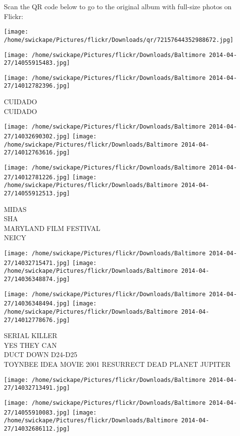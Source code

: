 \documentclass[10pt,letterpaper]{article}
\begin{document}
Scan the QR code below to go to the original album with full-size photos on Flickr:

\texttt{[image: /home/swickape/Pictures/flickr/Downloads/qr/72157644352988672.jpg]}
\pagebreak

\texttt{[image: /home/swickape/Pictures/flickr/Downloads/Baltimore 2014-04-27/14055915483.jpg]}

\vspace{0.25in}
\texttt{[image: /home/swickape/Pictures/flickr/Downloads/Baltimore 2014-04-27/14012782396.jpg]}

CUIDADO\\
CUIDADO
\pagebreak

\texttt{[image: /home/swickape/Pictures/flickr/Downloads/Baltimore 2014-04-27/14032690302.jpg]}
\texttt{[image: /home/swickape/Pictures/flickr/Downloads/Baltimore 2014-04-27/14012763616.jpg]}

\texttt{[image: /home/swickape/Pictures/flickr/Downloads/Baltimore 2014-04-27/14012781226.jpg]}
\texttt{[image: /home/swickape/Pictures/flickr/Downloads/Baltimore 2014-04-27/14055912513.jpg]}

MIDAS\\
SHA\\
MARYLAND FILM FESTIVAL\\
NEICY
\pagebreak

\texttt{[image: /home/swickape/Pictures/flickr/Downloads/Baltimore 2014-04-27/14032715471.jpg]}
\texttt{[image: /home/swickape/Pictures/flickr/Downloads/Baltimore 2014-04-27/14036348874.jpg]}

\texttt{[image: /home/swickape/Pictures/flickr/Downloads/Baltimore 2014-04-27/14036348494.jpg]}
\texttt{[image: /home/swickape/Pictures/flickr/Downloads/Baltimore 2014-04-27/14012778676.jpg]}

SERIAL KILLER\\
YES THEY CAN\\
DUCT DOWN D24{-}D25\\
TOYNBEE IDEA MOVIE 2001 RESURRECT DEAD PLANET JUPITER
\pagebreak

\texttt{[image: /home/swickape/Pictures/flickr/Downloads/Baltimore 2014-04-27/14032713491.jpg]}

\vspace{0.25in}
\texttt{[image: /home/swickape/Pictures/flickr/Downloads/Baltimore 2014-04-27/14055910083.jpg]}
\texttt{[image: /home/swickape/Pictures/flickr/Downloads/Baltimore 2014-04-27/14032686112.jpg]}
\end{document}
